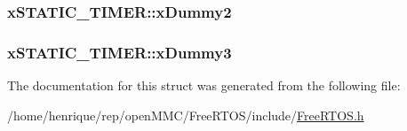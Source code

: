 \hypertarget{structxSTATIC__TIMER_a622e2e596e5829c9197bb44b9009474f}{
\subsubsection[{x\-Dummy2}]{ x\-S\-T\-A\-T\-I\-C\-\_\-\-T\-I\-M\-E\-R\-::x\-Dummy2}}\label{structxSTATIC__TIMER_a622e2e596e5829c9197bb44b9009474f}
\hypertarget{structxSTATIC__TIMER_a60d582d1d0b5b9b15e8050d5ae29bc30}{
\subsubsection[{x\-Dummy3}]{ x\-S\-T\-A\-T\-I\-C\-\_\-\-T\-I\-M\-E\-R\-::x\-Dummy3}}\label{structxSTATIC__TIMER_a60d582d1d0b5b9b15e8050d5ae29bc30}


The documentation for this struct was generated from the following file\-:\begin{DoxyCompactItemize}
\item 
/home/henrique/rep/open\-M\-M\-C/\-Free\-R\-T\-O\-S/include/\hyperlink{FreeRTOS_8h}{Free\-R\-T\-O\-S.\-h}\end{DoxyCompactItemize}
